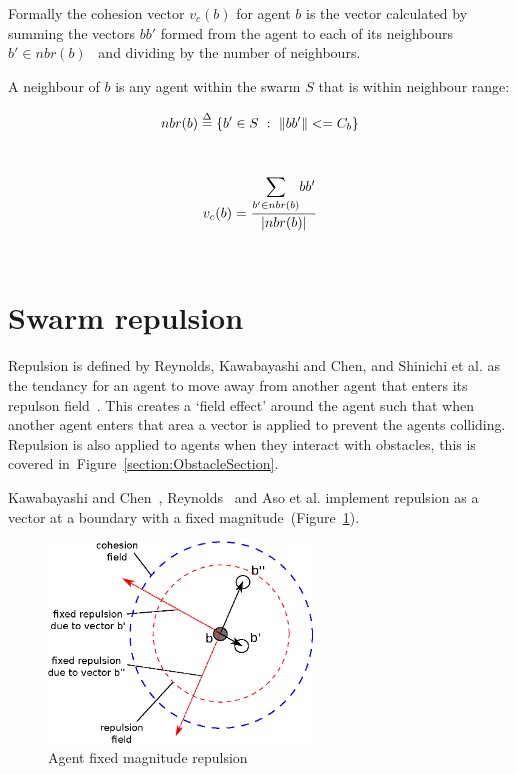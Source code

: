 Formally the cohesion vector $v_{c}(b)$ for agent $b$ is the vector calculated by summing the vectors $bb'$ formed from the agent to each of its neighbours~$b' \in nbr(b)$~\cite{HAY:08} and dividing by the number of neighbours.


A neighbour of $b$ is any agent within the swarm $S$ that is within neighbour range:

\begin{equation}\label{eq:Neighbours1}
nbr(b) \buildrel \Delta \over = \{b' \in S~:~\magn{bb'} <= C_b\}
\end{equation}‎

\begin{equation}\label{eq:FlyToCentre1}
v_{c}(b) = \frac{\mathlarger{\sum_{b' \in nbr(b)}}{bb'}}{\card{nbr(b)}}
\end{equation}‎

\section{Swarm repulsion}\label{sec:Repulsion1}
Repulsion is defined by Reynolds, Kawabayashi and Chen, and Shinichi et al. as the tendancy for an agent to move away from another agent that enters its repulson field~\cite{REY:87, KC:08, AYSH:08}. This creates a `field effect' around the agent such that when another agent enters that area a vector is applied to prevent the agents colliding. Repulsion is also applied to agents when they interact with obstacles, this is covered in~Figure~\ref{section:ObstacleSection}.

Kawabayashi and Chen~\cite{KC:08}, Reynolds~\cite{REY:87} and Aso et al. implement repulsion as a vector at a boundary with a fixed magnitude~(Figure~\ref{methods:Repulsion3}). 

\begin{figure}[H]
\begin{center}
\includegraphics[width=7cm]{CHAPTER-2/figures/Repulsion3}
\caption{Agent fixed magnitude repulsion\label{methods:Repulsion3}}
\end{center}
\end{figure}

